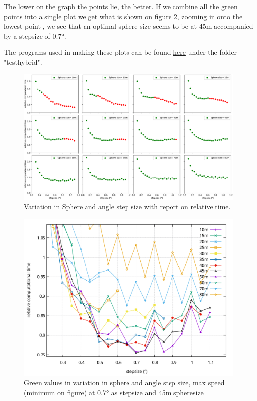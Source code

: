 \documentclass[11pt,a4paper,faculty=we,language=en,doctype=report]{cls/ugent-doc}
\begin{document}
The lower on the graph the points lie, the better. If we combine all the green points into a single plot
we get what is shown on figure \ref{fig:SphereStepFinal},
zooming in onto the lowest point , we see that an optimal sphere size seems to be at 45m accompanied
by a stepsize of 0.7°.

The programs used in making these plots can be found \href{https://github.com/arthuradriaens-code/projects-mt}{here}
under the folder "testhybrid".
\begin{figure}
	\includegraphics[width=\textwidth]{figures/subplotofallstepsphere.pdf}
	\caption{Variation in Sphere and angle step size with report on relative time.}
	\label{fig:SphereStepInfl}
\end{figure}
\begin{figure}
	\includegraphics[width=\textwidth]{figures/SphereAndStepFinal.pdf}
	\caption{Green values in variation in sphere and angle step size, max speed (minimum on figure) at 0.7° as stepsize and 45m spheresize}
	\label{fig:SphereStepFinal}
\end{figure}
\newpage
\end{document}
